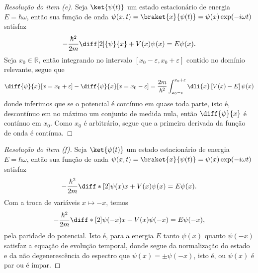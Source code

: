 \begin{proof}[Resolução do item (e)]
    Seja \(\ket{\psi(t)}\) um estado estacionário de energia \(E = \hbar \omega\), então sua função de onda \(\psi(x,t) = \braket{x}{\psi(t)} = \psi(x)\exp(-i\omega t)\) satisfaz
    \begin{equation*}
        -\frac{\hbar^2}{2m} \diff[2]{\psi}{x} + V(x)\psi(x) = E \psi(x).
    \end{equation*}
    Seja \(x_0 \in \mathbb{R}\), então integrando no intervalo \([x_0 - \varepsilon, x_0 + \varepsilon]\) contido no domínio relevante, segue que
    \begin{equation*}
        \diff{\psi}{x}[x = x_0 + \varepsilon] - \diff{\psi}{x}[x = x_0 - \varepsilon] = \frac{2m}{\hbar^2}\int_{x_0 - \varepsilon}^{x_0 + \varepsilon} \dli{x} \left[V(x) - E\right]\psi(x)
    \end{equation*}
    donde inferimos que se o potencial é contínuo em quase toda parte, isto é, descontínuo em no máximo um conjunto de medida nula, então \(\diff{\psi}{x}\) é contínuo em \(x_0\). Como \(x_0\) é arbitrário, segue que a primeira derivada da função de onda é contínua.
\end{proof}

\begin{proof}[Resolução do item (f)]
    Seja \(\ket{\psi(t)}\) um estado estacionário de energia \(E = \hbar \omega\), então sua função de onda \(\psi(x,t) = \braket{x}{\psi(t)} = \psi(x)\exp(-i\omega t)\) satisfaz
    \begin{equation*}
        -\frac{\hbar^2}{2m} \diff*[2]{\psi(x)}{x} + V(x)\psi(x) = E \psi(x).
    \end{equation*}
    Com a troca de variáveis \(x \mapsto -x\), temos
    \begin{equation*}
        -\frac{\hbar^2}{2m} \diff*[2]{\psi(-x)}{x} + V(x)\psi(-x) = E\psi(-x),
    \end{equation*}
    pela paridade do potencial. Isto é, para a energia \(E\) tanto \(\psi(x)\) quanto \(\psi(-x)\) satisfaz a equação de evolução temporal, donde segue da normalização do estado e da não degenerescência do espectro que \(\psi(x) = \pm \psi(-x)\), isto é, ou \(\psi(x)\) é par ou é ímpar.
\end{proof}

